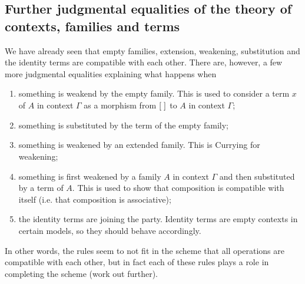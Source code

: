 \subsection{Further judgmental equalities of the theory of contexts, families and
terms}
We have already seen that empty families, extension, weakening, substitution
and the identity terms are compatible with each other. There are, however, a
few more judgmental equalities explaining what happens when
\begin{enumerate}
\item something is weakend by the empty family. This is used to consider a term
      $x$ of $A$ in context $\Gamma$ as a morphism from ${[\;]}_{}$ to $A$ in
      context $\Gamma$;
\item something is substituted by the term of the empty family;
\item something is weakened by an extended family. This is Currying for weakening;
\item something is first weakened by a family $A$ in context $\Gamma$ and then
      substituted by a term of $A$. This is used to show that composition is
      compatible with itself (i.e. that composition is associative);
\item the identity terms are joining the party. Identity terms are empty contexts
      in certain models, so they should behave accordingly.
\end{enumerate}
In other words, the rules seem to not fit in the scheme that all operations are
compatible with each other, but in fact each of these rules plays a role in
completing the scheme (work out further).

